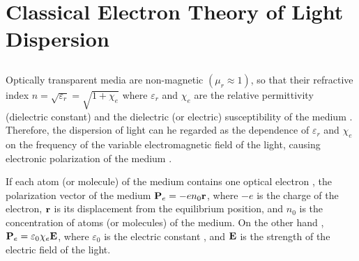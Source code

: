 \section{Classical Electron Theory of Light Dispersion}
\label{sec-34.5} 


\subsection{}\label{34.5.1} Optically transparent media are non-magnetic $(\mu_{r} \approx  1)$, so that their refractive index $ n = \sqrt{\varepsilon_{r}} = \sqrt{1  + \chi_{e}}$ where $\varepsilon_{r}$ and $\chi_{e}$ are the relative permittivity (dielectric constant) and the dielectric (or electric) susceptibility of the medium . Therefore, the dispersion of light can he regarded as the dependence of $\varepsilon_{r}$ and $\chi_{e}$ on the frequency of the variable electromagnetic field of the light, causing electronic polarization of the medium . 

If each atom (or molecule) of the medium contains one optical electron , the polarization vector of the medium  $\vb{P}_{e} = -en_{0} \vb{r}$, where $-e$ is the charge of the electron, $\vb{r}$ is its displacement from the equilibrium position, and $n_{0}$ is the concentration of atoms (or molecules) of the medium. On the other hand , $\vb{P}_{e} = \varepsilon_{0}\chi_{e} \vb{E}$, where $\varepsilon_{0}$ is the electric constant , and $\vb{E}$ is the strength of the
electric field of the light.

